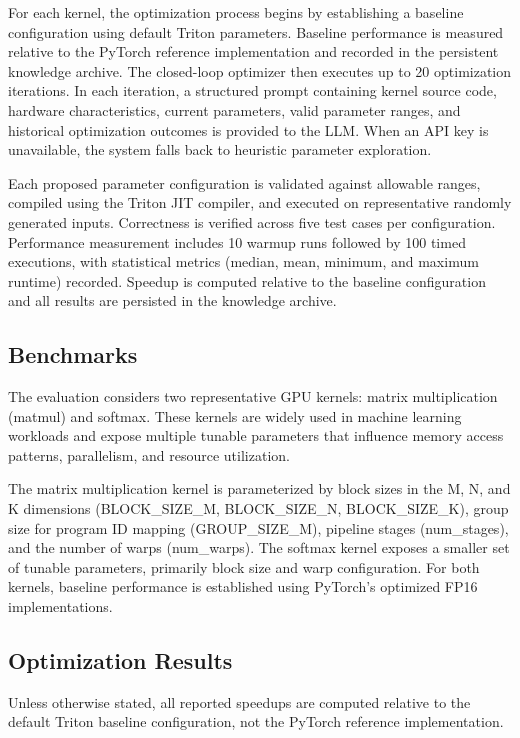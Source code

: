 \documentclass{article}
\begin{document}
For each kernel, the optimization process begins by establishing a baseline configuration using default Triton parameters. Baseline performance is measured relative to the PyTorch reference implementation and recorded in the persistent knowledge archive. The closed-loop optimizer then executes up to 20 optimization iterations. In each iteration, a structured prompt containing kernel source code, hardware characteristics, current parameters, valid parameter ranges, and historical optimization outcomes is provided to the LLM. When an API key is unavailable, the system falls back to heuristic parameter exploration.

Each proposed parameter configuration is validated against allowable ranges, compiled using the Triton JIT compiler, and executed on representative randomly generated inputs. Correctness is verified across five test cases per configuration. Performance measurement includes 10 warmup runs followed by 100 timed executions, with statistical metrics (median, mean, minimum, and maximum runtime) recorded. Speedup is computed relative to the baseline configuration and all results are persisted in the knowledge archive.

\subsection{Benchmarks}

The evaluation considers two representative GPU kernels: matrix multiplication (matmul) and softmax. These kernels are widely used in machine learning workloads and expose multiple tunable parameters that influence memory access patterns, parallelism, and resource utilization.

The matrix multiplication kernel is parameterized by block sizes in the M, N, and K dimensions (BLOCK\_SIZE\_M, BLOCK\_SIZE\_N, BLOCK\_SIZE\_K), group size for program ID mapping (GROUP\_SIZE\_M), pipeline stages (num\_stages), and the number of warps (num\_warps). The softmax kernel exposes a smaller set of tunable parameters, primarily block size and warp configuration. For both kernels, baseline performance is established using PyTorch’s optimized FP16 implementations.

\subsection{Optimization Results}

Unless otherwise stated, all reported speedups are computed relative to the default Triton baseline configuration, not the PyTorch reference implementation.\newline
\end{document}
